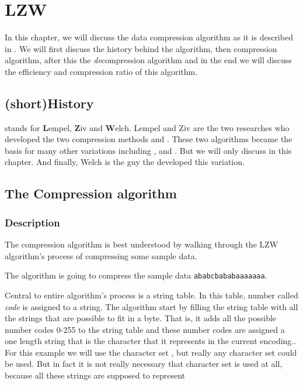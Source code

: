 \begin{comment}
  
\end{comment}

\chapter{LZW}
\label{ch:rle}

\begin{refsection}

  In this chapter, we will discuss the data compression algorithm
  \lzw{} as it is described in
  \cite{nelson89:_lzw_data_compr,Welch:1984:THD:1319729.1320134,Salomon:2004:DCC}. We
  will first discuss the history behind the algorithm, then
  compression algorithm, after this the
  \textit{de}compression algorithm and in the end we will discuss the
  efficiency and compression ratio of this algorithm.

\section{(short)History}

\lzw stands for \textbf{L}empel, \textbf{Z}iv and
\textbf{W}elch. Lempel and Ziv are the two researches who developed
the two compression methods \lzseven and \lzeight. These two
algorithms became the basis for many other \lz variations including
\lzma \cite{palov11}, \lzw and \lzss \cite{Salomon:2004:DCC}. But we
will only discuss \lzw in this chapter. And finally, Welch is the guy
the developed this \lz variation.

\section{The Compression algorithm}

\subsection{Description}
\label{sec:lzw-desc}

The \lzw compression algorithm is best
understood by walking through the LZW algorithm's process of
compressing some sample data.

The algorithm is going to compress the sample data
\texttt{ababcbababaaaaaaa}.

Central to entire algorithm's process is a string table. In this
table, number called \textit{code} is assigned to a
string. The algorithm start by filling the string table with all the
strings that are possible to fit in a byte. That is, it adds all the
possible number codes 0-255 to the string table and these number codes
are assigned a one length string that is the character that it
represents in the current encoding.. For this example we will use the
character set \ascii \cite{rfc20}, but really any character set could
be used. But in fact it is not really necessary that character set is
used at all, because all these strings are supposed to represent


\end{refsection}
